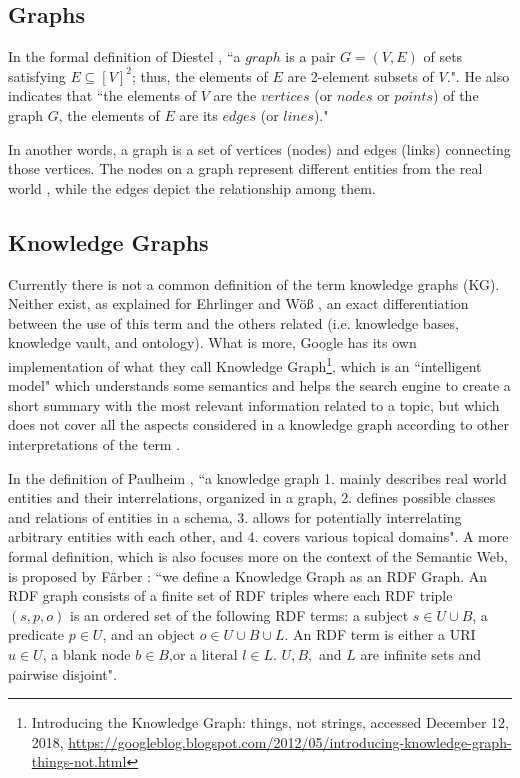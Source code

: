 \documentclass[runningheads]{llncs}
\begin{document}
\subsection{Graphs} \label{graphs}
In the formal definition of Diestel \cite{Diestel}, ``a $graph$ is a pair $G = (V, E)$ of sets satisfying $E \subseteq [V]^2$; thus, the elements of $E$ are 2-element subsets of $V$.". He also indicates that ``the elements of $V$ are the $vertices$ (or $nodes$ or $points$) of the graph $G$, the elements of $E$ are its $edges$ (or $lines$)."

In another words, a graph is a set of vertices (nodes) and edges (links) connecting those vertices. The nodes on a graph represent different entities from the real world \cite{Robinson}, while the edges depict the relationship among them.

\subsection{Knowledge Graphs} \label{knowledge-graphs}
Currently there is not a common definition of the term knowledge graphs (KG). Neither exist, as explained for Ehrlinger and W{\"o}{\ss} \cite{Ehrlinger}, an exact differentiation between the use of this term and the others related (i.e. knowledge bases, knowledge vault, and ontology). What is more, Google has its own implementation of what they call Knowledge Graph\footnote{Introducing the Knowledge Graph: things, not strings, accessed December 12, 2018,  \href{https://googleblog.blogspot.com/2012/05/introducing-knowledge-graph-things-not.html}{https://googleblog.blogspot.com/2012/05/introducing-knowledge-graph-things-not.html}}, which is an ``intelligent model" which understands some semantics and helps the search engine to create a short summary with the most relevant information related to a topic, but which does not cover all the aspects considered in a knowledge graph according to other interpretations of the term \cite{Ehrlinger}.

In the definition of Paulheim \cite{Paulheim}, ``a knowledge graph
1. mainly describes real world entities and their interrelations, organized in a graph, 2. defines possible classes and relations of entities in a schema, 3. allows for potentially interrelating arbitrary entities with each other, and 4. covers various topical domains". A more formal definition, which is also focuses more on the context of the Semantic Web, is proposed by F{\"a}rber \cite{Farber}: ``we define a Knowledge Graph as an RDF Graph. An RDF graph consists of a finite set of RDF triples where each RDF triple $(s, p, o)$ is an ordered set of the following RDF terms: a subject $s \in U ∪ B$, a predicate $p \in U$, and an object $o \in U ∪ B ∪ L$. An RDF term is either a URI $u \in U$, a blank node $b \in B$,or a literal $l \in L$. $U, B,$ and $L$ are infinite sets and pairwise disjoint".
\end{document}
